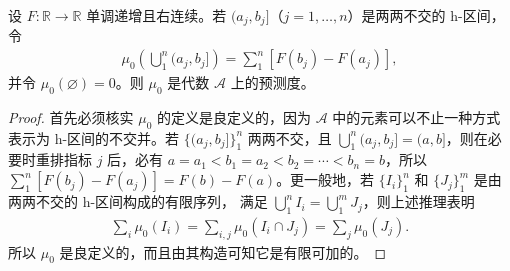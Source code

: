 \documentclass[../../main.tex]{subfiles}%
\begin{document}
\begin{proposition}\label{proposition:ch01-stieltjes-premeasure}
设 $F:\mathbb{R}\to\mathbb{R}$ 单调递增且右连续。若 $(a_j,b_j]$（$j=1,\ldots,n$）是两两不交的 h-区间，令
\begin{align*}
\mu_0\left(\bigcup_1^n(a_j,b_j]\right)=\sum_1^n[F(b_j)-F(a_j)],
\end{align*}
并令 $\mu_0(\varnothing)=0$。则 $\mu_0$ 是代数 $\mathscr{A}$ 上的预测度。
\end{proposition}

\begin{proof}
首先必须核实 $\mu_0$ 的定义是良定义的，因为 $\mathscr{A}$ 中的元素可以不止一种方式表示为 h-区间的不交并。若 $\{(a_j,b_j]\}_1^n$ 两两不交，且 $\bigcup_1^n(a_j,b_j]=(a,b]$，则在必要时重排指标 $j$ 后，必有 $a=a_1<b_1=a_2<b_2=\cdots<b_n=b$，所以 $\sum_1^n[F(b_j)-F(a_j)]=F(b)-F(a)$。更一般地，若 $\{I_i\}_1^n$ 和 $\{J_j\}_1^m$ 是由两两不交的 h-区间构成的有限序列，
满足 $\bigcup_1^n I_i=\bigcup_1^m J_j$，则上述推理表明
\begin{align*}
\sum_i\mu_0(I_i)=\sum_{i,j}\mu_0(I_i\cap J_j)=\sum_j\mu_0(J_j).
\end{align*}
所以 $\mu_0$ 是良定义的，而且由其构造可知它是有限可加的。


\end{proof}
\end{document}
